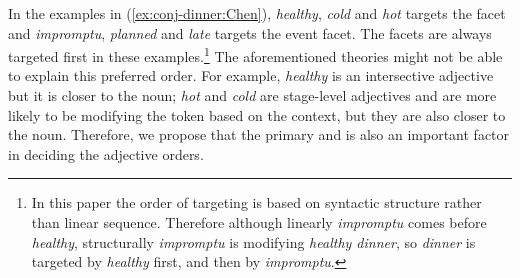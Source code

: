 \documentclass[output=paper,colorlinks,citecolor=brown,chinesefont]{langscibook}
\begin{document}
\ea \label{ex:conj-dinner:Chen}
 \label{ex:imp-healthy-dinner:Chen}
 \label{ex:healthy-imp-dinner:Chen}
 \label{ex:plan-cold-lunch:Chen}
 \label{ex:cold-plan-lunch:Chen}
 \label{ex:late-hot-dinner:Chen}
 \label{ex:hot-late-dinner:Chen}
\z\z

In the examples in (\ref{ex:conj-dinner:Chen}), \emph{healthy}, \emph{cold} and \emph{hot} targets the  facet and \emph{impromptu}, \emph{planned} and \emph{late} targets the event facet. The  facets are always targeted first in these examples.\footnote{In this paper the order of targeting is based on syntactic structure rather than linear sequence. Therefore although linearly \emph{impromptu} comes before \emph{healthy}, structurally \emph{impromptu} is modifying \emph{healthy dinner}, so \emph{dinner} is targeted by \emph{healthy} first, and then by \emph{impromptu}.} The aforementioned theories might not be able to explain this preferred order. For example, \emph{healthy} is an intersective adjective but it is closer to the noun; \emph{hot} and \emph{cold} are stage-level adjectives and are more likely to be modifying the token based on the context, but they are also closer to the noun. Therefore, we propose that the primary and  is also an important factor in deciding the adjective orders.

\end{document}
